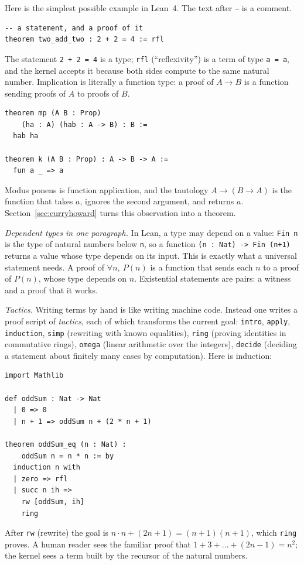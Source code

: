 Here is the simplest possible example in Lean~4. The text after \texttt{--} is a comment.
\begin{verbatim}
-- a statement, and a proof of it
theorem two_add_two : 2 + 2 = 4 := rfl
\end{verbatim}
The statement \texttt{2 + 2 = 4} is a type; \texttt{rfl} (``reflexivity'') is a term of type \texttt{a = a}, and the kernel accepts it because both sides compute to the same natural number.
Implication is literally a function type: a proof of $A\to B$ is a function sending proofs of $A$ to proofs of $B$.
\begin{verbatim}
theorem mp (A B : Prop)
    (ha : A) (hab : A -> B) : B :=
  hab ha

theorem k (A B : Prop) : A -> B -> A :=
  fun a _ => a
\end{verbatim}
Modus ponens is function application, and the tautology $A\to(B\to A)$ is the function that takes $a$, ignores the second argument, and returns $a$. Section~\ref{sec:curryhoward} turns this
observation into a theorem.

\emph{Dependent types in one paragraph.} In Lean, a type may depend on a value: \texttt{Fin n} is the type of natural numbers below \texttt{n}, so a function \texttt{(n : Nat) -> Fin (n+1)}
returns a value whose type depends on its input. This is exactly what a universal statement needs. A proof of $\forall n,\ P(n)$ is a function that sends each $n$ to a proof of $P(n)$,
whose type depends on $n$. Existential statements are pairs: a witness and a proof that it works.

\emph{Tactics.} Writing terms by hand is like writing machine code. Instead one writes a proof script of \emph{tactics}, each of which transforms the current goal: \texttt{intro},
\texttt{apply}, \texttt{induction}, \texttt{simp} (rewriting with known equalities), \texttt{ring} (proving identities in commutative rings), \texttt{omega} (linear arithmetic over the integers),
\texttt{decide} (deciding a statement about finitely many cases by computation). Here is induction:
\begin{verbatim}
import Mathlib

def oddSum : Nat -> Nat
  | 0 => 0
  | n + 1 => oddSum n + (2 * n + 1)

theorem oddSum_eq (n : Nat) :
    oddSum n = n * n := by
  induction n with
  | zero => rfl
  | succ n ih =>
    rw [oddSum, ih]
    ring
\end{verbatim}
After \texttt{rw} (rewrite) the goal is $n\cdot n+(2n+1)=(n+1)(n+1)$, which \texttt{ring} proves. A human reader sees the familiar proof that $1+3+\dots+(2n-1)=n^2$; the kernel sees a term
built by the recursor of the natural numbers.

